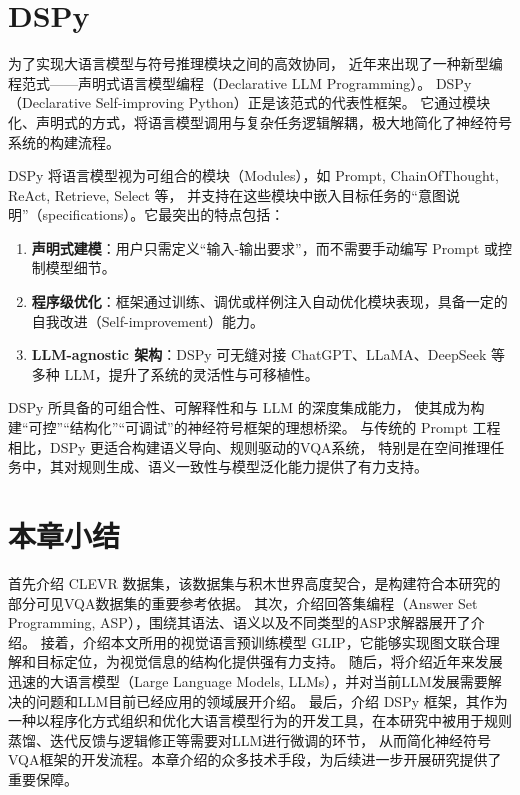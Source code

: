 \section{DSPy}
为了实现大语言模型与符号推理模块之间的高效协同，
近年来出现了一种新型编程范式——声明式语言模型编程（Declarative LLM Programming）。
DSPy（Declarative Self-improving Python）正是该范式的代表性框架。
它通过模块化、声明式的方式，将语言模型调用与复杂任务逻辑解耦，极大地简化了神经符号系统的构建流程。

DSPy 将语言模型视为可组合的模块（Modules），如 Prompt, ChainOfThought, ReAct, Retrieve, Select 等，
并支持在这些模块中嵌入目标任务的“意图说明”（specifications）。它最突出的特点包括：
\begin{enumerate}[itemsep=0pt,parsep=0pt]
\item \textbf{声明式建模}：用户只需定义“输入-输出要求”，而不需要手动编写 Prompt 或控制模型细节。
\item \textbf{程序级优化}：框架通过训练、调优或样例注入自动优化模块表现，具备一定的自我改进（Self-improvement）能力。
\item \textbf{LLM-agnostic 架构}：DSPy 可无缝对接 ChatGPT、LLaMA、DeepSeek 等多种 LLM，提升了系统的灵活性与可移植性。
\end{enumerate}

DSPy 所具备的可组合性、可解释性和与 LLM 的深度集成能力，
使其成为构建“可控”“结构化”“可调试”的神经符号框架的理想桥梁。
与传统的 Prompt 工程相比，DSPy 更适合构建语义导向、规则驱动的VQA系统，
特别是在空间推理任务中，其对规则生成、语义一致性与模型泛化能力提供了有力支持。
\section{本章小结}
首先介绍 CLEVR 数据集，该数据集与积木世界高度契合，是构建符合本研究的部分可见VQA数据集的重要参考依据。
其次，介绍回答集编程（Answer Set Programming, ASP），围绕其语法、语义以及不同类型的ASP求解器展开了介绍。
接着，介绍本文所用的视觉语言预训练模型 GLIP，它能够实现图文联合理解和目标定位，为视觉信息的结构化提供强有力支持。
随后，将介绍近年来发展迅速的大语言模型（Large Language Models, LLMs），并对当前LLM发展需要解决的问题和LLM目前已经应用的领域展开介绍。
最后，介绍 DSPy 框架，其作为一种以程序化方式组织和优化大语言模型行为的开发工具，在本研究中被用于规则蒸馏、迭代反馈与逻辑修正等需要对LLM进行微调的环节，
从而简化神经符号VQA框架的开发流程。本章介绍的众多技术手段，为后续进一步开展研究提供了重要保障。